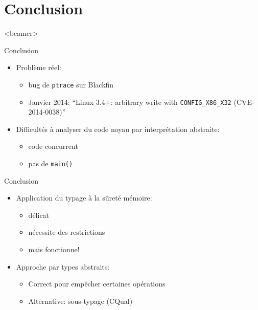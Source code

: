 \section{Conclusion}
  \begin{frame}<beamer>
   \tableofcontents[currentsection]
 \end{frame}


\begin{frame}{Conclusion}
    \begin{itemize}
    \item Problème réel:
        \begin{itemize}
            \item bug de \texttt{ptrace} sur Blackfin
            \item Janvier 2014:
                \enquote{Linux 3.4+: arbitrary write with \texttt{CONFIG\_X86\_X32} (CVE-2014-0038)}
        \end{itemize}
    \item Difficultés à analyser du code noyau par interprétation abstraite:
        \begin{itemize}
            \item code concurrent
            \item pas de \texttt{main()}
        \end{itemize}
    \end{itemize}
\end{frame}

\begin{frame}{Conclusion}
    \begin{itemize}
    \item Application du typage à la sûreté mémoire:
        \begin{itemize}
            \item délicat
            \item nécessite des restrictions
            \item mais fonctionne!
        \end{itemize}
    \item Approche par types abstraits:
        \begin{itemize}
            \item Correct pour empêcher certaines opérations
            \item Alternative: sous-typage (CQual)
        \end{itemize}
    \end{itemize}
\end{frame}

